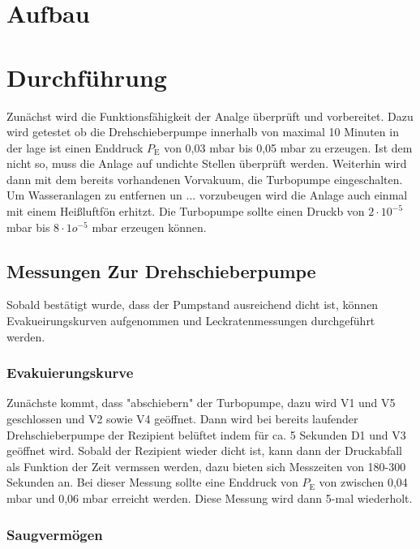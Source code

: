 \section{Aufbau}

\section{Durchführung}
	Zunächst wird die Funktionsfähigkeit der Analge überprüft und vorbereitet. 
	Dazu wird getestet ob die Drehschieberpumpe innerhalb von maximal 10 Minuten in der lage ist einen Enddruck $P_\text{E}$ von 0,03 mbar bis 0,05 mbar zu erzeugen. 
	Ist dem nicht so, muss die Anlage auf undichte Stellen überprüft werden.
	Weiterhin wird dann mit dem bereits vorhandenen Vorvakuum, die Turbopumpe eingeschalten. 
	Um Wasseranlagen zu entfernen un ... vorzubeugen wird die Anlage auch einmal mit einem Heißluftfön erhitzt.
	Die Turbopumpe sollte einen Druckb von $2 \cdot 10^{-5}$ mbar bis $8 \cdot 1o^{-5}$ mbar erzeugen können.

	\subsection{Messungen Zur Drehschieberpumpe}
		Sobald bestätigt wurde, dass der Pumpstand ausreichend dicht ist, können Evakueirungskurven aufgenommen und Leckratenmessungen durchgeführt werden.

		\subsubsection{Evakuierungskurve}

			Zunächste kommt, dass "abschiebern" der Turbopumpe, dazu wird V1 und V5 geschlossen und V2 sowie V4 geöffnet.
			Dann wird bei bereits laufender Drehschieberpumpe der Rezipient belüftet indem für ca. 5 Sekunden D1 und V3 geöffnet wird. 
			Sobald der Rezipient wieder dicht ist, kann dann der Druckabfall als Funktion der Zeit vermssen werden, dazu bieten sich Messzeiten von 180-300 Sekunden an.
			Bei dieser Messung sollte eine Enddruck von $P_\text{E}$ von zwischen 0,04 mbar und 0,06 mbar erreicht werden.
			Diese Messung wird dann 5-mal wiederholt.

		\subsubsection{Saugvermögen} 
  
